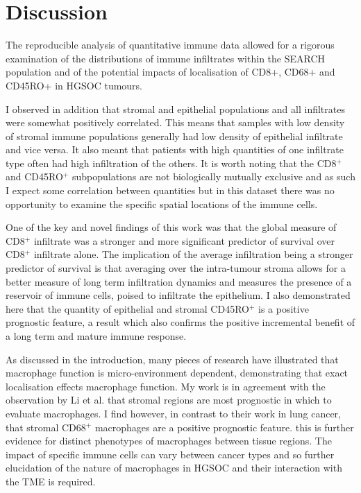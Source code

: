 \clearpage

\section{Discussion}

The reproducible analysis of quantitative immune data allowed for a rigorous examination of the distributions of immune infiltrates within the SEARCH population and of the potential impacts of localisation of CD8+, CD68+ and CD45RO+ in HGSOC tumours. 

I observed in addition that stromal and epithelial populations and all infiltrates were somewhat positively correlated. This means that samples with low density of stromal immune populations generally had low density of epithelial infiltrate and vice versa. It also meant that patients with high quantities of one infiltrate type often had high infiltration of the others. It is worth noting that the  CD8$^+$ and  CD45RO$^+$ subpopulations are not biologically mutually exclusive and as such I expect some correlation between quantities but in this dataset there was no opportunity to examine the specific spatial locations of the immune cells. 

 One of the key and novel findings of this work was that the global measure of CD8$^+$ infiltrate was a stronger and more significant predictor of survival over CD8$^+$ infiltrate alone. The implication of the average infiltration being a stronger predictor of survival is that averaging over the intra-tumour stroma allows for a better measure of long term infiltration dynamics and measures the presence of a reservoir of immune cells, poised to infiltrate the epithelium.  I also demonstrated here that the quantity of epithelial and stromal CD45RO$^+$ is a positive prognostic feature, a result which also confirms the positive incremental benefit of a long term and mature immune response. 


As discussed in the introduction, many pieces of research have illustrated that macrophage function is micro-environment dependent\cite{ZhangMacrophage2014, li2018intratumoral}, demonstrating that exact localisation effects macrophage function. My work is in agreement with the observation by Li et al. that stromal regions are most prognostic in which to evaluate macrophages. I find however, in contrast to their work in lung cancer, that stromal CD68$^+$ macrophages are a positive prognostic feature. this is further evidence for distinct phenotypes of macrophages between tissue regions. The impact of specific immune cells can vary between cancer types and so further elucidation of the nature of macrophages in HGSOC and their interaction with the TME is required.


